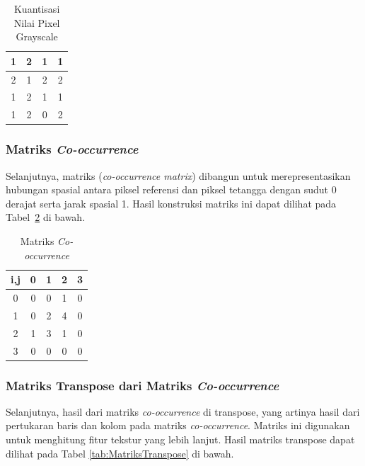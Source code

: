 \begin{table}[H]
\centering
\begin{tabular}{|c|c|c|c|}
	\hline
	1 & 2 & 1 & 1 \\ \hline
	2 & 1 & 2 & 2 \\ \hline
	1 & 2 & 1 & 1 \\ \hline
	1 & 2 & 0 & 2 \\ \hline
\end{tabular}
\caption{Kuantisasi Nilai Pixel Grayscale}
\label{tab:tabel-numerik}
\end{table}

\subsubsection{Matriks \textit{Co-occurrence}} \label{III.Kuantisasi Nilai Pixel}
Selanjutnya, matriks (\textit{co-occurrence matrix}) dibangun untuk merepresentasikan hubungan spasial antara piksel referensi dan piksel tetangga dengan sudut 0 derajat serta jarak spasial 1. Hasil konstruksi matriks ini dapat dilihat pada Tabel~\ref{tab:MatriksCo-occurrence} di bawah.
\begin{table}[H]
\centering
\begin{tabular}{|c|c|c|c|c|}
\hline
\cellcolor{gray!20}i,j & \cellcolor{gray!20}0 & \cellcolor{gray!20}1 & \cellcolor{gray!20}2 & \cellcolor{gray!20}3 \\
\hline
\cellcolor{gray!20}0 & 0 & 0 & 1 & 0 \\
\hline
\cellcolor{gray!20}1 & 0 & 2 & 4 & 0 \\
\hline
\cellcolor{gray!20}2 & 1 & 3 & 1 & 0 \\
\hline
\cellcolor{gray!20}3 & 0 & 0 & 0 & 0 \\
\hline
\end{tabular}
\caption{Matriks \textit{Co-occurrence}}
\label{tab:MatriksCo-occurrence}
\end{table}


\subsubsection{Matriks Transpose dari Matriks \textit{Co-occurrence}} \label{III.Matriks Transpose dari Matriks Co-occurrence}
Selanjutnya, hasil dari matriks \textit{co-occurrence} di transpose, yang artinya hasil dari pertukaran baris dan kolom pada matriks \textit{co-occurrence}. Matriks ini digunakan untuk menghitung fitur tekstur yang lebih lanjut. Hasil matriks transpose dapat dilihat pada Tabel \ref{tab:MatriksTranspose} di bawah.

